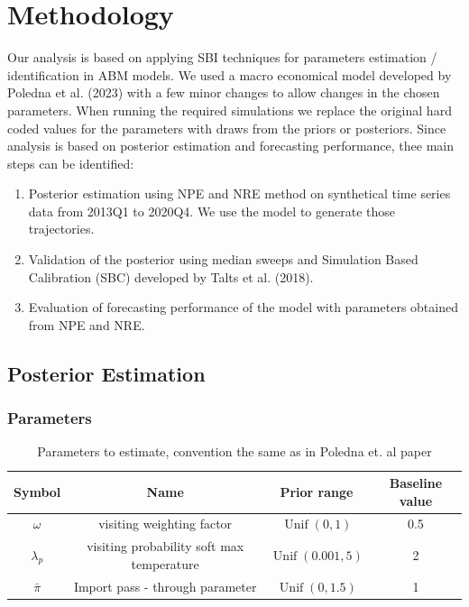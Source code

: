 \documentclass[12pt]{article}
\begin{document}
\section{Methodology}
Our analysis is based on applying SBI techniques for parameters estimation / identification in ABM models. We used a macro economical model developed by Poledna et al. (2023) with a few minor changes to allow changes in the chosen parameters. When running the required simulations we replace the original hard coded values for the parameters with draws from the priors or posteriors. Since analysis is based on posterior estimation and forecasting performance, thee main steps can be identified:
\begin{enumerate}
    \item Posterior estimation using NPE and NRE method on synthetical time series data from 2013Q1 to 2020Q4. We use the model to generate those trajectories.
    \item Validation of the posterior using median sweeps and Simulation Based Calibration (SBC) developed by Talts et al. (2018).
    \item Evaluation of forecasting performance of the model with parameters obtained from NPE and NRE.
\end{enumerate}

\subsection{Posterior Estimation}

\subsubsection*{Parameters}

\begin{table}[h]
    \centering
    \begin{tabular}{c|c|c|c}
        Symbol & Name & Prior range & Baseline value \\
        \hline 
         $\omega$ & visiting weighting factor & $\operatorname{Unif}(0, 1)$ & 0.5 \\
         $\lambda_p$ & visiting probability soft max temperature & $\operatorname{Unif}(0.001, 5)$ & 2 \\
         $\bar{\pi}$ & Import pass - through parameter & $\operatorname{Unif}(0, 1.5)$ & 1 \\
         \hline \hline
    \end{tabular}
    \caption{Parameters to estimate, convention the same as in Poledna et. al paper}
    \label{tab:parameters_to_estimate}
\end{table}
\end{document}

